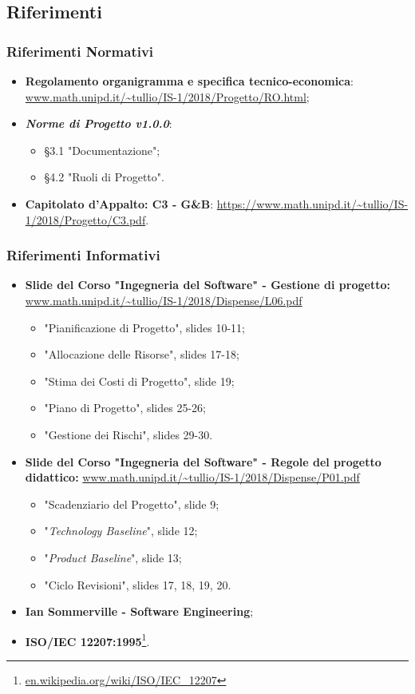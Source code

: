 \subsection{Riferimenti}
\subsubsection{Riferimenti Normativi}
\begin{itemize}
	\item \textbf{Regolamento organigramma e specifica tecnico-economica}: \url{www.math.unipd.it/~tullio/IS-1/2018/Progetto/RO.html};
	\item \textbf{\textit{Norme di Progetto v1.0.0}}:
		\begin{itemize}
			\item §3.1 "Documentazione";
			\item §4.2 "Ruoli di Progetto".
		\end{itemize}
	\item \textbf{Capitolato d'Appalto: C3 - G\&B}: \url{https://www.math.unipd.it/~tullio/IS-1/2018/Progetto/C3.pdf}.
\end{itemize}

\subsubsection{Riferimenti Informativi}
\begin{itemize}
	\item \textbf{Slide del Corso "Ingegneria del Software" - Gestione di progetto:} \url{www.math.unipd.it/~tullio/IS-1/2018/Dispense/L06.pdf}
	\begin{itemize}
		\item "Pianificazione di Progetto", slides 10-11; 
		\item "Allocazione delle Risorse", slides 17-18;
		\item "Stima dei Costi di Progetto", slide 19;
		\item "Piano di Progetto", slides 25-26;
		\item "Gestione dei Rischi", slides 29-30.
	\end{itemize}
	\item \textbf{Slide del Corso "Ingegneria del Software" - Regole del progetto didattico:} \url{www.math.unipd.it/~tullio/IS-1/2018/Dispense/P01.pdf}
		\begin{itemize}
			\item "Scadenziario del Progetto", slide 9;
			\item "\textit{Technology Baseline}", slide 12;
			\item "\textit{Product Baseline}", slide 13;
			\item "Ciclo Revisioni", slides 17, 18, 19, 20. 
		\end{itemize}
	\item \textbf{Ian Sommerville - Software Engineering};
	\item \textbf{ISO/IEC 12207:1995}\footnote{\url{en.wikipedia.org/wiki/ISO/IEC_12207}}.
\end{itemize}




